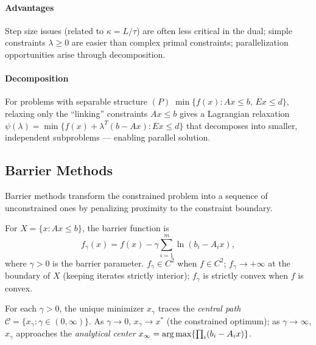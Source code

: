 \paragraph{Advantages}

Step size issues (related to $\kappa = L/\tau$) are often less critical in the dual; simple constraints $\lambda \geq 0$ are easier than complex primal constraints; parallelization opportunities arise through decomposition.

\paragraph{Decomposition}

For problems with separable structure $(P)\; \min\{f(x) : Ax \leq b,\, Ex \leq d\}$, relaxing only the ``linking'' constraints $Ax \leq b$ gives a Lagrangian relaxation $\psi(\lambda) = \min\{f(x) + \lambda^T(b - Ax) : Ex \leq d\}$ that decomposes into smaller, independent subproblems --- enabling parallel solution.


\subsection{Barrier Methods}\label{ssec:barrier}

Barrier methods transform the constrained problem into a sequence of unconstrained ones by penalizing proximity to the constraint boundary.

\begin{defn}\label{def:barrier}
	For $X = \{x : Ax \leq b\}$, the barrier function is
	\begin{equation}\label{eq:log-barrier}
		f_\gamma(x) = f(x) - \gamma \sum_{i=1}^{m} \ln(b_i - A_i x),
	\end{equation}
	where $\gamma > 0$ is the barrier parameter.
	$f_\gamma \in C^2$ when $f \in C^2$; $f_\gamma \to +\infty$ at the boundary of $X$ (keeping iterates strictly interior); $f_\gamma$ is strictly convex when $f$ is convex.
\end{defn}

For each $\gamma > 0$, the unique minimizer $x_\gamma$ traces the \textit{central path} $\mathcal{C} = \{x_\gamma : \gamma \in (0, \infty)\}$.
As $\gamma \to 0$, $x_\gamma \to x^*$ (the constrained optimum); as $\gamma \to \infty$, $x_\gamma$ approaches the \textit{analytical center} $x_\infty = \operatorname*{arg\,max}\{\prod_i (b_i - A_i x)\}$.

